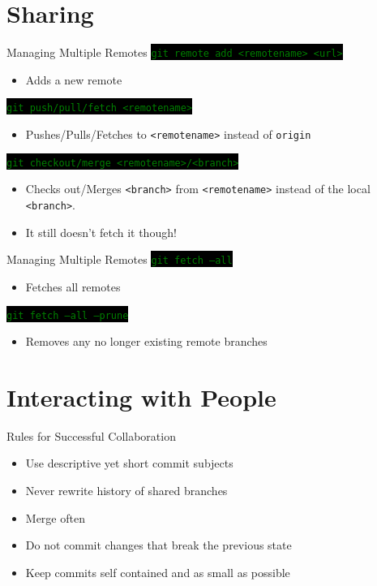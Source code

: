 \documentclass[
14pt,
aspectratio=169,
usenames,
dvipsnames,
x11names]{beamer}
\newcommand{\code}[1]{{\small\setlength{\fboxsep}{2pt}\colorbox{black}{\textcolor{green}{\texttt{#1}}}}}
\begin{document}
\section{Sharing}

\begin{frame}{Managing Multiple Remotes}
  \code{git remote add <remotename> <url>}
  \begin{itemize}
  \item Adds a new remote
  \end{itemize}

  \vfill
  \pause

  \code{git push/pull/fetch <remotename>}
  \begin{itemize}
  \item Pushes/Pulls/Fetches to \texttt{<remotename>} instead of
    \texttt{origin}
  \end{itemize}

  \vfill
  \pause

  \code{git checkout/merge <remotename>/<branch>}

  \begin{itemize}
  \item Checks out/Merges \texttt{<branch>} from \texttt{<remotename>}
    instead of the local \texttt{<branch>}.
  \item It still \alert{doesn't fetch it} though!
  \end{itemize}
\end{frame}

\begin{frame}{Managing Multiple Remotes}
  \code{git fetch --all}
  \begin{itemize}
  \item Fetches all remotes
  \end{itemize}

  \vfill
  \pause

  \code{git fetch --all --prune}
  \begin{itemize}
  \item Removes any no longer existing remote branches
  \end{itemize}
\end{frame}

\section{Interacting with People}

\begin{frame}{Rules for Successful Collaboration}
  \begin{itemize}[<+->] \setlength{\itemsep}{\fill}
  \item Use \alert{descriptive yet short} commit subjects
  \item \alert{Never} rewrite history of shared branches
  \item \alert{Merge} often
  \item \alert{Do not} commit changes that break the previous state
  \item Keep commits \alert{self contained} and as small as possible
  \end{itemize}
\end{frame}
\end{document}
